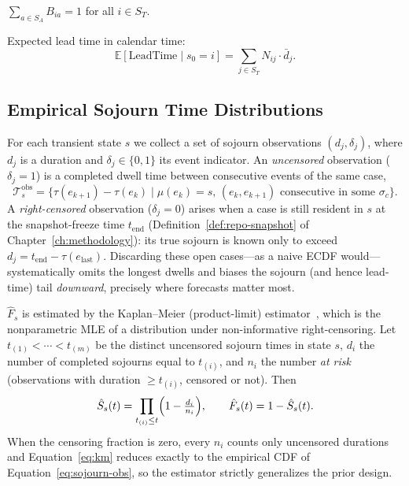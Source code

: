 \begin{property}
\label{prop:absorption-certainty}
$\sum_{a \in S_A} B_{ia} = 1$ for all $i \in S_T$.
\end{property}

Expected lead time in calendar time:
\begin{equation}
\label{eq:expected-lead-time}
\mathbb{E}[\text{LeadTime} \mid s_0 = i] = \sum_{j \in S_T} N_{ij} \cdot \bar{d}_j.
\end{equation}


\subsection{Empirical Sojourn Time Distributions}
\label{sec:s3-sojourn}

\begin{definition}
\label{def:sojourn-distribution}
For each transient state $s$ we collect a set of sojourn observations
$(d_j, \delta_j)$, where $d_j$ is a duration and $\delta_j \in \{0,1\}$ its
event indicator. An \emph{uncensored} observation ($\delta_j = 1$) is a
completed dwell time between consecutive events of the same case,
\begin{equation}
\label{eq:sojourn-obs}
\mathcal{T}_s^{\text{obs}} = \{\tau(e_{k+1}) - \tau(e_k) \mid \mu(e_k) = s,\,
    (e_k, e_{k+1}) \text{ consecutive in some } \sigma_c\}.
\end{equation}
A \emph{right-censored} observation ($\delta_j = 0$) arises when a case is
still resident in $s$ at the snapshot-freeze time $t_{\text{end}}$
(Definition~\ref{def:repo-snapshot} of Chapter~\ref{ch:methodology}): its
true sojourn is known only to exceed $d_j = t_{\text{end}} - \tau(e_{\text{last}})$.
Discarding these open cases---as a naive ECDF would---systematically omits
the longest dwells and biases the sojourn (and hence lead-time) tail
\emph{downward}, precisely where forecasts matter most.
\end{definition}

\begin{definition}
\label{def:km-sojourn}
$\hat{F}_s$ is estimated by the Kaplan--Meier (product-limit)
estimator~\cite{kaplan1958nonparametric, klein2003survival}, which is the
nonparametric MLE of a distribution under non-informative right-censoring.
Let $t_{(1)} < \cdots < t_{(m)}$ be the distinct uncensored sojourn times in
state $s$, $d_i$ the number of completed sojourns equal to $t_{(i)}$, and
$n_i$ the number \emph{at risk} (observations with duration $\geq t_{(i)}$,
censored or not). Then
\begin{equation}
\label{eq:km}
\hat{S}_s(t) = \prod_{t_{(i)} \leq t}\Bigl(1 - \tfrac{d_i}{n_i}\Bigr),
\qquad \hat{F}_s(t) = 1 - \hat{S}_s(t).
\end{equation}
When the censoring fraction is zero, every $n_i$ counts only uncensored
durations and Equation~\ref{eq:km} reduces exactly to the empirical CDF of
Equation~\ref{eq:sojourn-obs}, so the estimator strictly generalizes the
prior design.
\end{definition}

